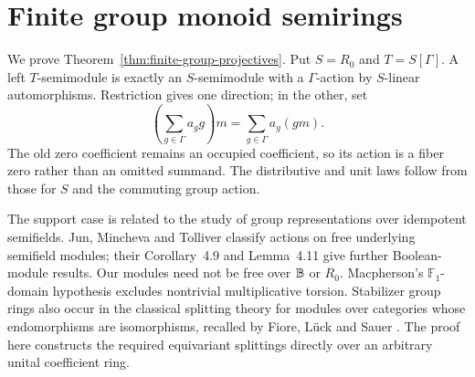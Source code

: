 \section{Finite group monoid semirings}
\label{sec:finite-group-projectives}

We prove Theorem~\ref{thm:finite-group-projectives}. Put $S=R_0$ and
$T=S[\Gamma]$. A left $T$-semimodule is exactly an $S$-semimodule
with a $\Gamma$-action by $S$-linear automorphisms. Restriction gives
one direction; in the other, set
\[
 \left(\sum_{g\in\Gamma}a_g g\right)m
   =\sum_{g\in\Gamma}a_g(gm).
\]
The old zero coefficient remains an occupied coefficient, so its action
is a fiber zero rather than an omitted summand. The distributive and
unit laws follow from those for $S$ and the commuting group action.

The support case is related to the study of group representations over
idempotent semifields. Jun, Mincheva and Tolliver
\cite[arXiv version~3, \S1.1 and Definition~3.1]{JMT} classify actions on free underlying
semifield modules; their Corollary~4.9 and Lemma~4.11 give further
Boolean-module results. Our modules need not be free over $\mathbb B$ or
$R_0$. Macpherson's $\mathbb F_1$-domain hypothesis
\cite[Definition~4.9, p.~14]{Macpherson} excludes nontrivial
multiplicative torsion. Stabilizer group rings also occur in the
classical splitting theory for modules over categories whose
endomorphisms are isomorphisms, recalled by Fiore, L\"uck and Sauer
\cite[pp.~306--307, splitting functors and Theorem~1.5]{FLS}. The proof here
constructs the required equivariant splittings directly over an
arbitrary unital coefficient ring.

